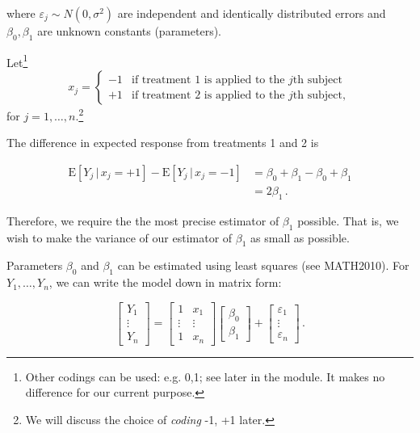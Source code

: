 \documentclass[
]{book}
\theoremstyle{definition}
\theoremstyle{definition}
\theoremstyle{definition}
\theoremstyle{definition}
\theoremstyle{remark}
\begin{document}
where \(\varepsilon_j\sim N(0,\sigma^{2})\) are independent and identically distributed errors and \(\beta_{0}, \beta_{1}\) are unknown constants (parameters).

Let\footnote{Other codings can be used: e.g. 0,1; see later in the module. It makes no difference for our current purpose.}
\begin{equation}
x_{j}=\left\{\begin{array}{ll}
-1&\textrm{if treatment 1 is applied to the $j$th subject}\\
+1&\textrm{if treatment 2 is applied to the $j$th subject}\nonumber ,
\end{array}
\right.
\end{equation}
for \(j=1,\dots,n\).\footnote{We will discuss the choice of \emph{coding} -1, +1 later.}

The difference in expected response from treatments 1 and 2 is

\begin{equation}
\begin{split}
\textrm{E}[Y_j\, |\, x_j = +1] - \textrm{E}[Y_j\, |\, x_j = -1] & = \beta_{0}+\beta_{1}-\beta_{0}+\beta_{1} \\
& = 2\beta_{1}\,.
\end{split}
\label{eq:ex-ex-response}
\end{equation}

Therefore, we require the the most precise estimator of \(\beta_{1}\) possible. That is, we wish to make the variance of our estimator of \(\beta_1\) as small as possible.

Parameters \(\beta_{0}\) and \(\beta_{1}\) can be estimated using least squares (see MATH2010). For \(Y_1,\dots,Y_n\), we can write the model down in matrix form:

\begin{equation*}
\left[ \begin{array}{c}
Y_1\\
\vdots\\
Y_n\end{array}\right]
=\left[ \begin{array}{cc}
1&x_{1}\\
\vdots&\vdots\\
1&x_{n}\end{array}\right]
\left[ \begin{array}{c}
\beta_{0}\\
\beta_{1}\end{array}\right]
+\left[ \begin{array}{c}
\varepsilon_{1}\\
\vdots\\
\varepsilon_{n}\end{array}\right]\,.
\end{equation*}
\end{document}
